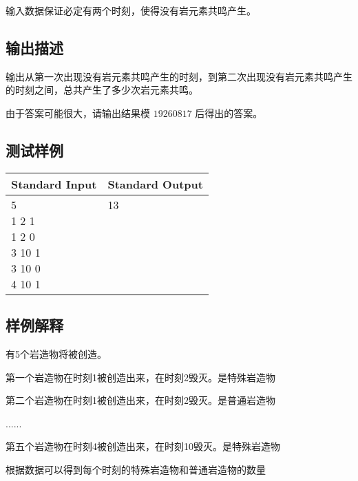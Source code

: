输入数据保证必定有两个时刻，使得没有岩元素共鸣产生。

\subsection*{输出描述}

输出从第一次出现没有岩元素共鸣产生的时刻，到第二次出现没有岩元素共鸣产生的时刻之间，总共产生了多少次岩元素共鸣。

由于答案可能很大，请输出结果模 $19260817$ 后得出的答案。

\subsection*{测试样例}

\begin{table}[H]
\begin{tabularx}{\textwidth}{|X|X|}
    \hline
    \textbf{Standard Input} & \textbf{Standard Output} \\ 
    \hline
    \tablecell{
        5 \\
        1 2 1 \\
        1 2 0 \\
        3 10 1 \\
        3 10 0 \\
        4 10 1 \\
    } &
    \tablecell{
        13 \\ \\ \\ \\ \\ \\
    } \\
    \hline
\end{tabularx}
\end{table}

\subsection*{样例解释}

有5个岩造物将被创造。

第一个岩造物在时刻1被创造出来，在时刻2毁灭。是特殊岩造物

第二个岩造物在时刻1被创造出来，在时刻2毁灭。是普通岩造物

......

第五个岩造物在时刻4被创造出来，在时刻10毁灭。是特殊岩造物

根据数据可以得到每个时刻的特殊岩造物和普通岩造物的数量

